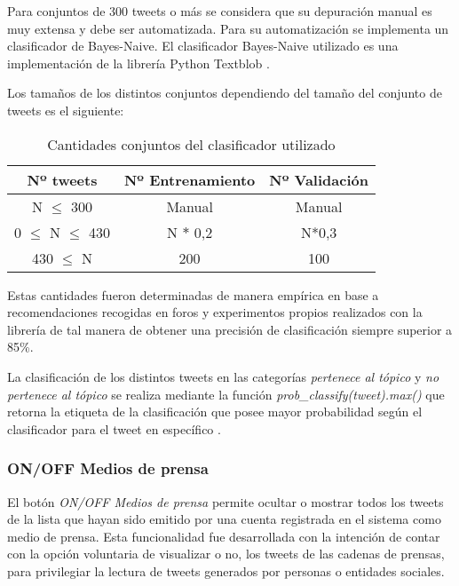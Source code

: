 Para conjuntos de 300 tweets o más se considera que su depuración manual es muy extensa y debe ser automatizada. Para su automatización se implementa un clasificador de Bayes-Naive. El clasificador Bayes-Naive utilizado es una implementación de la librería Python Textblob \cite{textblobWebsite}.

Los tamaños de los distintos conjuntos dependiendo del tamaño del conjunto de tweets es el siguiente:

\begin{table}[h]
	\centering
	\begin{tabular}{| c | c | c |}
		\hline
		Nº tweets & Nº Entrenamiento & Nº Validación \\ \hline
		N $\leqslant$ 300	& Manual & Manual \\ \hline
		0 $\leqslant$ N $\leqslant$ 430	& N $*$ 0,2 & N*0,3	\\ \hline
		430 $\leqslant$ N & 200 & 100	\\ \hline
	\end{tabular}
	\caption {Cantidades conjuntos del clasificador utilizado}
\end{table}

Estas cantidades fueron determinadas de manera empírica en base a recomendaciones recogidas en foros y experimentos propios realizados con la librería de tal manera de obtener una precisión de clasificación siempre superior a 85\%.

	

La clasificación de los distintos tweets en las categorías \emph{pertenece al tópico} y \emph{no pertenece al tópico} se realiza mediante la función \emph{prob\_classify(tweet).max()} que retorna la etiqueta de la clasificación que posee mayor probabilidad según el clasificador para el tweet en específico \cite{naivebayesdoc}.



	



\subsubsection{ON/OFF Medios de prensa}
El botón \emph{ON/OFF Medios de prensa} permite ocultar o mostrar todos los tweets de la lista que hayan sido emitido por una cuenta registrada en el sistema como medio de prensa. Esta funcionalidad fue desarrollada con la intención de contar con la opción voluntaria de visualizar o no, los tweets de las cadenas de prensas, para privilegiar la lectura de tweets generados por personas o entidades sociales.
